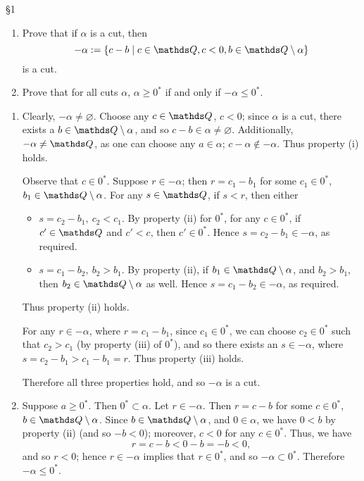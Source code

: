 \documentclass{homework}
\begin{document}
\begin{problem}{\S 1}
  \begin{enumerate}[label=(\alph*)]
    \item 
      Prove that if $\alpha$ is a cut, then \[
        -\alpha := \{c-b\mid c\in \Q,c<0,b\in \Q\setminus \alpha\} 
      \] is a cut.
    \item Prove that for all cuts $ \alpha$, $ \alpha\ge 0^*$ if and only if $-\alpha\le 0^*$.
  \end{enumerate}
\end{problem}

\begin{solution}
  \begin{enumerate}[label=(\alph*)]
    \item Clearly, $-\alpha\neq \varnothing$. Choose any $c\in \Q$, $c<0$; since $\alpha$ is a cut,
      there exists a $b\in \Q\setminus \alpha$, and so $ c-b\in \alpha\neq \varnothing$.
      Additionally, $-\alpha\neq \Q$, as one can choose any $a\in \alpha$; $c-\alpha\not\in
      -\alpha$. Thus property (i) holds.

      Observe that $c\in 0^*$. Suppose $r\in -\alpha$; then $r=c_1-b_1$ for some $ c_1\in 0^*$, $
      b_1\in \Q\setminus \alpha$. For any $s \in \Q$, if $s<r$, then either
      \begin{itemize}
        \item $s=c_2-b_1,\ c_2<c_1$. By property (ii) for $0^*$, for any $c\in 0^*$, if $c'\in \Q$ 
          and $c'<c$, then $c'\in 0^*$. Hence $s=c_2-b_1\in -\alpha$, as required.
        \item $s=c_1-b_2,\ b_2>b_1$. By property (ii), if $ b_1\in \Q\setminus \alpha$, and $
          b_2>b_1$, then $ b_2\in \Q\setminus \alpha$ as well. Hence $s=c_1-b_2\in -\alpha$, as
          required.
      \end{itemize}
      Thus property (ii) holds.

      For any $r\in -\alpha$, where $r=c_1-b_1$, since $ c_1\in 0^*$, we can choose $ c_2\in 0^*$
      such that $ c_2>c_1$ (by property (iii) of $0^*$), and so there exists an $s \in -\alpha$,
      where $s=c_2-b_1>c_1-b_1=r$. Thus property (iii) holds.

      Therefore all three properties hold, and so $-\alpha$ is a cut.

    \item Suppose $a\ge 0^*$. Then $0^*\subset \alpha$. Let $r\in -\alpha$. Then $r=c-b$ for some
      $c\in 0^*$, $b\in \Q\setminus \alpha$. Since $b\in \Q\setminus \alpha$, and $0\in \alpha$, we
      have $0<b$ by property (ii) (and so $-b<0$); moreover, $c<0$ for any $c\in 0^*$. Thus, we have \[
        r = c - b < 0 - b = -b < 0
      ,\] and so $r<0$; hence $r\in -\alpha$ implies that $r\in 0^*$, and so $-\alpha\subset 0^*$.
      Therefore $-\alpha\le 0^*$.\\


\end{enumerate}
\end{solution}
\end{document}
